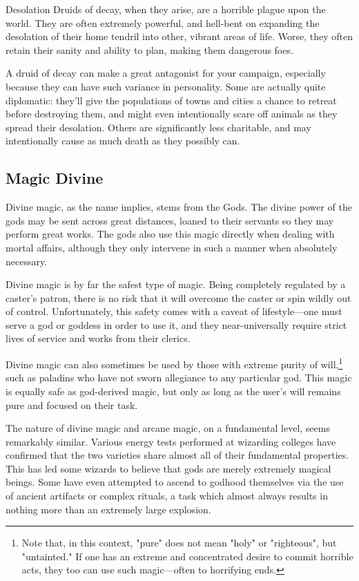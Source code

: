 \begin{multicols}{2}
\begin{adventureidea}{Desolation}
Druids of decay, when they arise, are a horrible plague upon the world.
They are often extremely powerful, and hell-bent on expanding the desolation of their home tendril into other, vibrant areas of life.
Worse, they often retain their sanity and ability to plan, making them dangerous foes.

A druid of decay can make a great antagonist for your campaign, especially because they can have such variance in personality.
Some are actually quite diplomatic: they'll give the populations of towns and cities a chance to retreat before destroying them, and might even intentionally scare off animals as they spread their desolation.
Others are significantly less charitable, and may intentionally cause as much death as they possibly can.
\end{adventureidea}

\subsection{Magic Divine}
Divine magic, as the name implies, stems from the Gods.
The divine power of the gods may be sent across great distances, loaned to their servants so they may perform great works.
The gods also use this magic directly when dealing with mortal affairs, although they only intervene in such a manner when absolutely necessary.

Divine magic is by far the safest type of magic.
Being completely regulated by a caster's patron, there is no risk that it will overcome the caster or spin wildly out of control.
Unfortunately, this safety comes with a caveat of lifestyle---one must serve a god or goddess in order to use it, and they near-universally require strict lives of service and works from their clerics.

Divine magic can also sometimes be used by those with extreme purity of will,\footnote{Note that, in this context, "pure" does not mean "holy" or "righteous", but "untainted." If one has an extreme and concentrated desire to commit horrible acts, they too can use such magic---often to horrifying ends.} such as paladins who have not sworn allegiance to any particular god.
This magic is equally safe as god-derived magic, but only as long as the user's will remains pure and focused on their task.

The nature of divine magic and arcane magic, on a fundamental level, seems remarkably similar.
Various energy tests performed at wizarding colleges have confirmed that the two varieties share almost all of their fundamental properties.
This has led some wizards to believe that gods are merely extremely magical beings.
Some have even attempted to ascend to godhood themselves via the use of ancient artifacts or complex rituals, a task which almost always results in nothing more than an extremely large explosion.
\end{multicols}
 
 
 

